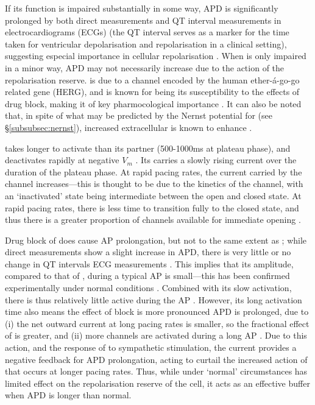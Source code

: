 \documentclass[../thesis-main.tex]{subfiles}
\begin{document}
 If its function is impaired substantially in some way, APD is significantly prolonged by both direct measurements and QT interval measurements in electrocardiograms (ECGs)  (the QT interval serves as a marker for the time taken for ventricular depolarisation and repolarisation in a clinical setting), suggesting especial importance in cellular repolarisation \citep{Varro2000, Lengyel2001, Jost2005}. When \ikr{} is only impaired in a minor way, APD may not necessarily increase due to the action of the repolarisation reserve. \ikr{} is due to a channel encoded by the human ether-\'a-go-go related gene (HERG), and is known for being its susceptibility to the effects of drug block, making it of key pharmocological importance \citep{Vandenberg2001, Haverkamp2000}. It can also be noted that, in spite of what may be predicted by the Nernst potential for \ikr{} (see \S\ref{subsubsec:nernst}), increased extracellular \K{} is known to enhance \ikr{} \citep{Sanguinetti1992, Yang1997}.
 
 \iks{} takes longer to activate than its partner (500-1000ms at plateau phase), and deactivates rapidly at negative $V_m$ \citep{Jost2005, Varro2011}. Its carries a slowly rising current over the duration of the plateau phase. At rapid pacing rates, the current carried by the \iks{} channel increases---this is thought to be due to the kinetics of the channel, with an `inactivated' state being intermediate between the open and closed state. At rapid pacing rates, there is less time to transition fully to the closed state, and thus there is a greater proportion of \iks{} channels available for immediate opening \citep{Silva2005}.
 
 Drug block of \iks{} does cause AP prolongation, but not to the same extent as \ikr{}; while direct measurements show a slight increase in APD, there is very little or no change in QT intervals ECG measurements \citep{Varro2000, Lengyel2001, Jost2005}. This implies that its amplitude, compared to that of \ikr{}, during a typical AP is small---this has been confirmed experimentally under normal conditions \citep{Varro2011}. Combined with its slow activation, there is thus relatively little \iks{} active during the AP \citep{Jost2005}. However, its long activation time also means the effect of \iks{} block is more pronounced APD is prolonged, due to (i) the net outward current at long pacing rates is smaller, so the fractional effect of \iks{} is greater, and (ii) more channels are activated during a long AP \citep{Carmeliet2006}. Due to this action, and the response of \iks{} to sympathetic stimulation, the current provides a negative feedback for APD prolongation, acting to curtail the increased action of \ica{} that occurs at longer pacing rates. Thus, while under `normal' circumstances \iks{} has limited effect on the repolarisation reserve of the cell, it acts as an effective buffer when APD is longer than normal.
 
\end{document}
